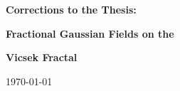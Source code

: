 \pagestyle{plain}
\vspace{-3em}
\begin{center}
	 \huge\bfseries Corrections to the Thesis:
	 
	  \huge\bfseries Fractional Gaussian Fields on the 
	  
	   \huge\bfseries Vicsek Fractal 
	   
	   \today
\end{center}

